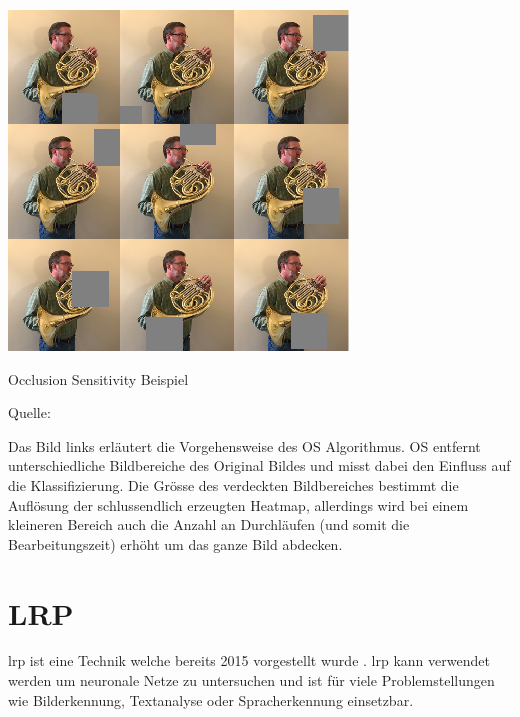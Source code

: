 \documentclass[
  12pt, %
  a4paper, %
  oneside, %
  openany, 
  numbers=noenddot, %
  BCOR=5mm, %
  parskip=half*, %
  thesis, %
]{bfhbook}
\begin{document}
\begin{center}
\begin{minipage}[t]{0.45\linewidth}
\vspace{0pt}
\includegraphics[width=\linewidth]{Bilder/occlusion-sensitivity-resnet-04.png}
\caption{Occlusion Sensitivity Beispiel}
\caption*{Quelle: \parencite{ocSensMathWorks}}
\end{minipage}\hfill
\begin{minipage}[t]{0.45\linewidth}
\vspace{20pt}
Das Bild links erläutert die Vorgehensweise des \gls{OS} Algorithmus. \Gls{OS} entfernt unterschiedliche Bildbereiche des Original Bildes und misst dabei den Einfluss auf die Klassifizierung. Die Grösse des verdeckten Bildbereiches bestimmt die Auflösung der schlussendlich erzeugten Heatmap, allerdings wird bei einem kleineren Bereich auch die Anzahl an Durchläufen (und somit die Bearbeitungszeit) erhöht um das ganze Bild abdecken.
\end{minipage}
\end{center}

\section{LRP}
\acrfull{lrp} ist eine Technik welche bereits 2015 vorgestellt wurde \parencite{Bach2015}. \acrshort{lrp} kann verwendet werden um neuronale Netze zu untersuchen und  ist für viele Problemstellungen wie Bilderkennung, Textanalyse oder Spracherkennung einsetzbar. 
\end{document}
